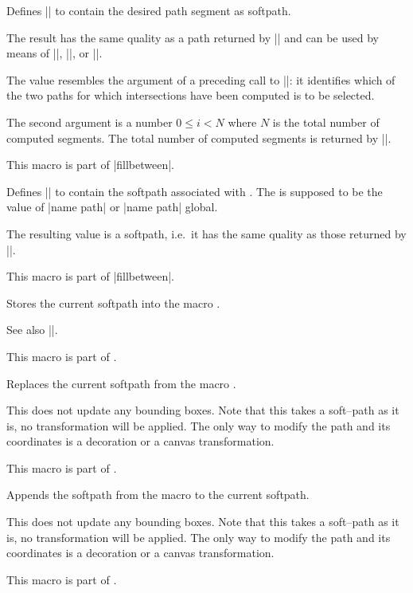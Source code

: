 \begin{command}{\pgfgetintersectionsegmentpath{}}
	Defines |\pgfretval| to contain the desired path segment as softpath.

	The result has the same quality as a path returned by |\pgfgetpath| and can be used by means of |\pgfsetpath|, |\pgfsetpathandBB|, or |\pgfaddpathandBB|.

	The value  resembles the argument of a preceding call to |\pgfcomputeintersectionsegments|: it identifies which of the two paths for which intersections have been computed is to be selected.

	The second argument  is a number $0 \le i < N$ where $N$ is the total number of computed segments. The total number of computed segments is returned by |\pgfcomputeintersectionsegments|.

	This macro is part of |fillbetween|.
\end{command}

\begin{command}{\tikzgetnamedpath{}}
	Defines |\pgfretval| to contain the softpath associated with . The  is supposed to be the value of |name path| or |name path| global.

	The resulting value is a softpath, i.e.\ it has the same quality as those returned by |\pgfgetpath|.

	This macro is part of |fillbetween|.
\end{command}

\begin{command}{\pgfgetpath{}}
	Stores the current softpath into the macro .

	See also |\tikzgetnamedpath|.

	This macro is part of \pgfname.
\end{command}

\begin{command}{\pgfsetpath{}}
	Replaces the current softpath from the macro .

	This does not update any bounding boxes. Note that this takes a soft--path as it is, no transformation will be applied. The only way to modify the path and its coordinates is a decoration or a canvas transformation.

	This macro is part of \pgfname.
\end{command}
\begin{command}{\pgfaddpath{}}
	Appends the softpath from the macro  to the current softpath.

	This does not update any bounding boxes. Note that this takes a soft--path as it is, no transformation will be applied. The only way to modify the path and its coordinates is a decoration or a canvas transformation.

	This macro is part of \pgfname.
\end{command}

